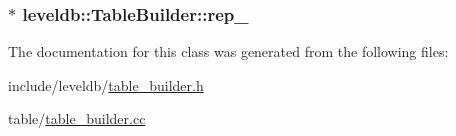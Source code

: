 \subsubsection[{rep\+\_\+}]{$\ast$ leveldb\+::\+Table\+Builder\+::rep\+\_\+\hspace{0.3cm}{\ttfamily [private]}}\label{classleveldb_1_1_table_builder_ab68d537c17c94be9ba6650b1db9bff74}


The documentation for this class was generated from the following files\+:\begin{DoxyCompactItemize}
\item 
include/leveldb/\hyperlink{table__builder_8h}{table\+\_\+builder.\+h}\item 
table/\hyperlink{table__builder_8cc}{table\+\_\+builder.\+cc}\end{DoxyCompactItemize}
